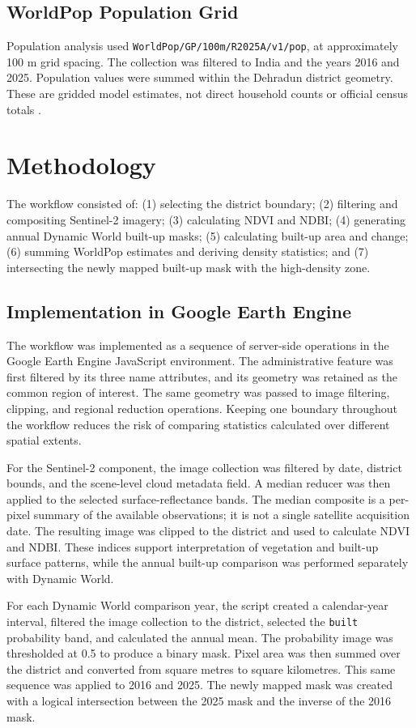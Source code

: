 \documentclass[conference]{IEEEtran}
\begin{document}
\subsection{WorldPop Population Grid}
Population analysis used \texttt{WorldPop/GP/100m/R2025A/v1/pop}, at approximately 100 m grid spacing. The collection was filtered to India and the years 2016 and 2025. Population values were summed within the Dehradun district geometry. These are gridded model estimates, not direct household counts or official census totals \cite{worldpop}.

\section{Methodology}
The workflow consisted of: (1) selecting the district boundary; (2) filtering and compositing Sentinel-2 imagery; (3) calculating NDVI and NDBI; (4) generating annual Dynamic World built-up masks; (5) calculating built-up area and change; (6) summing WorldPop estimates and deriving density statistics; and (7) intersecting the newly mapped built-up mask with the high-density zone.

\subsection{Implementation in Google Earth Engine}
The workflow was implemented as a sequence of server-side operations in the Google Earth Engine JavaScript environment. The administrative feature was first filtered by its three name attributes, and its geometry was retained as the common region of interest. The same geometry was passed to image filtering, clipping, and regional reduction operations. Keeping one boundary throughout the workflow reduces the risk of comparing statistics calculated over different spatial extents.

For the Sentinel-2 component, the image collection was filtered by date, district bounds, and the scene-level cloud metadata field. A median reducer was then applied to the selected surface-reflectance bands. The median composite is a per-pixel summary of the available observations; it is not a single satellite acquisition date. The resulting image was clipped to the district and used to calculate NDVI and NDBI. These indices support interpretation of vegetation and built-up surface patterns, while the annual built-up comparison was performed separately with Dynamic World.

For each Dynamic World comparison year, the script created a calendar-year interval, filtered the image collection to the district, selected the \texttt{built} probability band, and calculated the annual mean. The probability image was thresholded at 0.5 to produce a binary mask. Pixel area was then summed over the district and converted from square metres to square kilometres. This same sequence was applied to 2016 and 2025. The newly mapped mask was created with a logical intersection between the 2025 mask and the inverse of the 2016 mask.
\end{document}
